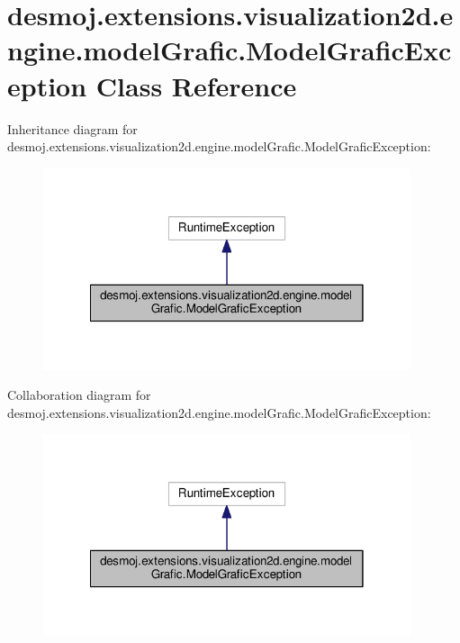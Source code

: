 \section{desmoj.\-extensions.\-visualization2d.\-engine.\-model\-Grafic.\-Model\-Grafic\-Exception Class Reference}
\label{classdesmoj_1_1extensions_1_1visualization2d_1_1engine_1_1model_grafic_1_1_model_grafic_exception}


Inheritance diagram for desmoj.\-extensions.\-visualization2d.\-engine.\-model\-Grafic.\-Model\-Grafic\-Exception\-:
\nopagebreak
\begin{figure}[H]
\begin{center}
\leavevmode
\includegraphics[width=306pt]{classdesmoj_1_1extensions_1_1visualization2d_1_1engine_1_1model_grafic_1_1_model_grafic_exception__inherit__graph}
\end{center}
\end{figure}


Collaboration diagram for desmoj.\-extensions.\-visualization2d.\-engine.\-model\-Grafic.\-Model\-Grafic\-Exception\-:
\nopagebreak
\begin{figure}[H]
\begin{center}
\leavevmode
\includegraphics[width=306pt]{classdesmoj_1_1extensions_1_1visualization2d_1_1engine_1_1model_grafic_1_1_model_grafic_exception__coll__graph}
\end{center}
\end{figure}

